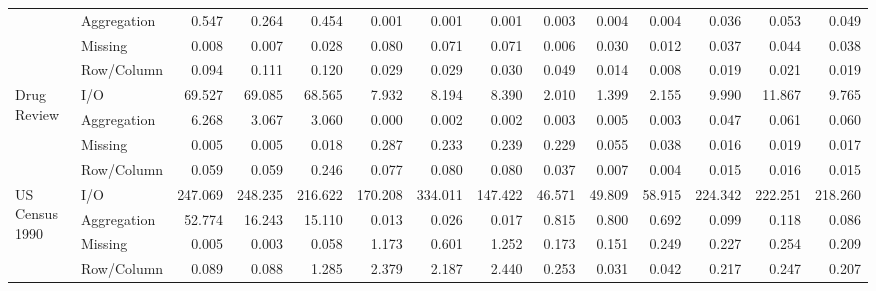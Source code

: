 \begin{tabular}{llrrrrrrrrrrrr}
 & Aggregation & 0.547 & 0.264 & 0.454 & 0.001 & 0.001 & 0.001 & 0.003 & 0.004 & 0.004 & 0.036 & 0.053 & 0.049 \\
 & Missing & 0.008 & 0.007 & 0.028 & 0.080 & 0.071 & 0.071 & 0.006 & 0.030 & 0.012 & 0.037 & 0.044 & 0.038 \\
 & Row/Column & 0.094 & 0.111 & 0.120 & 0.029 & 0.029 & 0.030 & 0.049 & 0.014 & 0.008 & 0.019 & 0.021 & 0.019 \\
\cline{1-14}
\multirow[t]{4}{*}{Drug Review} & I/O & 69.527 & 69.085 & 68.565 & 7.932 & 8.194 & 8.390 & 2.010 & 1.399 & 2.155 & 9.990 & 11.867 & 9.765 \\
 & Aggregation & 6.268 & 3.067 & 3.060 & 0.000 & 0.002 & 0.002 & 0.003 & 0.005 & 0.003 & 0.047 & 0.061 & 0.060 \\
 & Missing & 0.005 & 0.005 & 0.018 & 0.287 & 0.233 & 0.239 & 0.229 & 0.055 & 0.038 & 0.016 & 0.019 & 0.017 \\
 & Row/Column & 0.059 & 0.059 & 0.246 & 0.077 & 0.080 & 0.080 & 0.037 & 0.007 & 0.004 & 0.015 & 0.016 & 0.015 \\
\cline{1-14}
\multirow[t]{4}{*}{US Census 1990} & I/O & 247.069 & 248.235 & 216.622 & 170.208 & 334.011 & 147.422 & 46.571 & 49.809 & 58.915 & 224.342 & 222.251 & 218.260 \\
 & Aggregation & 52.774 & 16.243 & 15.110 & 0.013 & 0.026 & 0.017 & 0.815 & 0.800 & 0.692 & 0.099 & 0.118 & 0.086 \\
 & Missing & 0.005 & 0.003 & 0.058 & 1.173 & 0.601 & 1.252 & 0.173 & 0.151 & 0.249 & 0.227 & 0.254 & 0.209 \\
 & Row/Column & 0.089 & 0.088 & 1.285 & 2.379 & 2.187 & 2.440 & 0.253 & 0.031 & 0.042 & 0.217 & 0.247 & 0.207 \\
\cline{1-14}
\bottomrule
\end{tabular}
